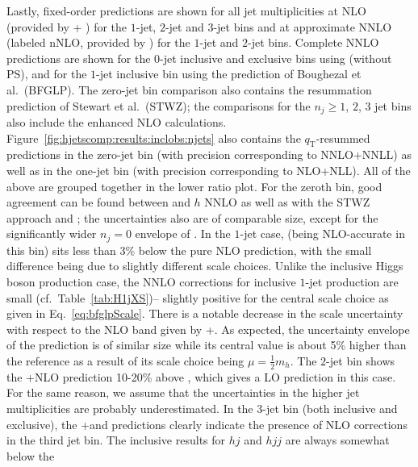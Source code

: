 Lastly, fixed-order predictions are shown for all jet multiplicities
at NLO (provided by \hjetscompGoSam{}+ \hjetscompSherpa) for the $1$-jet, $2$-jet and
$3$-jet bins and at approximate NNLO (labeled nNLO, provided by \hjetscompLoopsim) 
for the $1$-jet and $2$-jet bins.
Complete NNLO predictions are shown for the $0$-jet inclusive and
exclusive bins using \hjetscompSherpa (without PS), and for the $1$-jet inclusive
bin using the prediction of Boughezal et al.~(BFGLP).
The zero-jet bin comparison
also contains the resummation prediction of Stewart et
al.~(STWZ); the comparisons for the $n_j\ge 1$, $2$, $3$ jet bins also
include the \hjetscompMinlo enhanced NLO calculations.
Figure~\ref{fig:hjetscomp:results:inclobs:njets} also
contains the \hjetscompResbos $q_\text{T}$-resummed predictions in the zero-jet bin
(with precision corresponding to NNLO+NNLL) as well as in the
one-jet bin (with precision corresponding to NLO+NLL). All of the
above are grouped together in the lower ratio plot.
For the zeroth bin, good agreement can be found between \hjetscompPowheg and
\hjetscompSherpa $h$ NNLO as well as with the STWZ approach and \hjetscompResbos; the
uncertainties also are of comparable size, except for the
significantly wider $n_j=0$ envelope of \hjetscompPowheg.
In the $1$-jet case, \hjetscompPowheg (being NLO-accurate in this bin)
sits less than 3\% below the pure NLO prediction, with the small difference
being due to slightly different scale choices. Unlike the inclusive Higgs
boson production case, the NNLO corrections for inclusive $1$-jet
production are small (cf.~Table~\ref{tab:H1jXS})-- slightly positive
for the central scale choice as given in Eq.~\eqref{eq:bfglpScale}.
There is a notable decrease in the scale uncertainty with respect to
the NLO band given by \hjetscompGoSam{}+\hjetscompSherpa. As expected, the uncertainty
envelope of the \hjetscompResbos prediction is of similar size while its
central value is about 5\% higher than the reference as a result of
its scale choice being $\mu=\tfrac{1}{2}m_h$.
The $2$-jet bin shows the \hjetscompGoSam{}+\hjetscompSherpa NLO prediction 10-20\%
above \hjetscompPowheg, which gives a LO prediction in this case. For the same
reason, we assume that the \hjetscompPowheg uncertainties in the higher jet
multiplicities are probably underestimated.
In the $3$-jet bin (both inclusive and exclusive), the
\hjetscompGoSam{}+\hjetscompSherpa and \hjetscompSherpa \hjetscompMEPSatNLO predictions clearly indicate the
presence of  NLO corrections in the third jet bin. The \hjetscompLoopsim
inclusive results for $hj$ and $hjj$ are always somewhat below the
